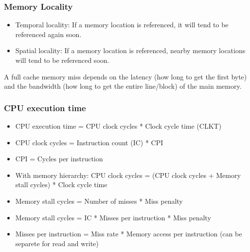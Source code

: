 \begin{frame}
    \frametitle{Memory Locality}
    \begin{itemize}
        \item Temporal locality: If a memory location is referenced, it will tend to be referenced again soon.
        \item Spatial locality: If a memory location is referenced, nearby memory locations will tend to be referenced soon.
    \end{itemize}
    A full cache memory miss depends on the latency (how long to get the first byte) and the bandwidth (how long to get the entire line/block) of the main memory.
\end{frame}

\begin{frame}
    \frametitle{CPU execution time}
    \begin{itemize}
        \item CPU execution time = CPU clock cycles * Clock cycle time (CLKT)
        \item CPU clock cycles = Instruction count (IC) * CPI
        \item CPI = Cycles per instruction
        \item With memory hierarchy: CPU clock cycles = (CPU clock cycles + Memory stall cycles) * Clock cycle time
        \item Memory stall cycles = Number of misses * Miss penalty
        \item Memory stall cycles = IC * Misses per instruction * Miss penalty
        \item Misses per instruction = Miss rate * Memory access per instruction (can be separete for read and write)
    \end{itemize}
\end{frame}